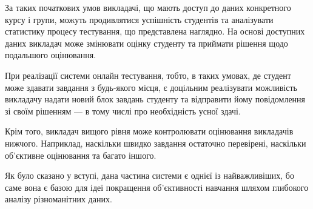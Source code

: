 За таких початкових умов викладачі, що мають доступ до даних конкретного
курсу і групи, можуть продивлятися успішність студентів та аналізувати
статистику процесу тестування, що представлена наглядно.
На основі доступних даних викладач може змінювати оцінку студенту та
приймати рішення щодо подальшого оцінювання.

При реалізації системи онлайн тестування, тобто, в таких умовах, де студент може
здавати завдання з будь-якого місця, є доцільним реалізувати можливість
викладачу надати новий блок завдань студенту та відправити йому
повідомлення зі своїм рішенням --- в тому числі про необхідність усної здачі.

Крім того, викладач вищого рівня може контролювати оцінювання викладачів
нижчого. Наприклад, наскільки швидко завдання остаточно перевірені, наскільки
об’єктивне оцінювання та багато іншого.

Як було сказано у вступі, дана частина системи є однієї із найважливіших, бо
саме вона є базою для ідеї покращення об’єктивності навчання шляхом глибокого
аналізу різноманітних даних.
